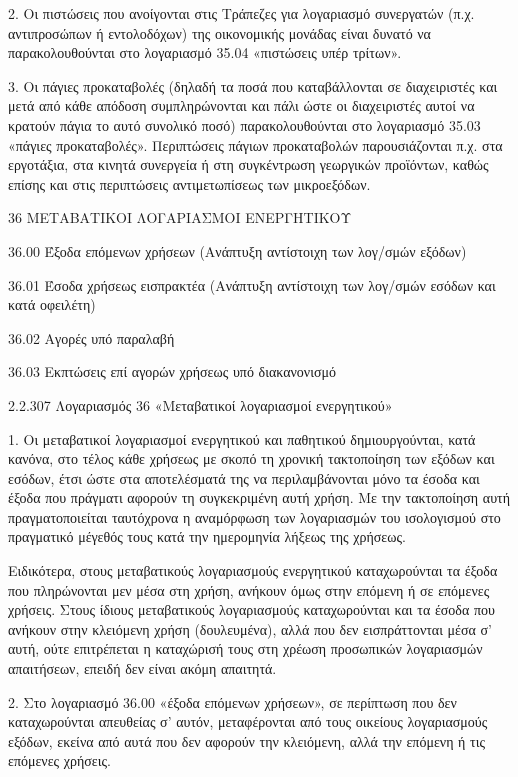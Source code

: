 \documentclass[A4,10pt,greek]{book}
\begin{document}
2. Οι πιστώσεις που ανοίγονται στις Τράπεζες για λογαριασμό συνεργατών (π.χ.  αντιπροσώπων ή εντολοδόχων) της οικονομικής μονάδας είναι δυνατό να παρακολουθούνται στο λογαριασμό 35.04 «πιστώσεις υπέρ τρίτων».

3. Οι πάγιες προκαταβολές (δηλαδή τα ποσά που καταβάλλονται σε διαχειριστές και μετά από κάθε απόδοση συμπληρώνονται και πάλι ώστε οι διαχειριστές αυτοί να κρατούν πάγια το αυτό συνολικό ποσό) παρακολουθούνται στο λογαριασμό 35.03 «πάγιες προκαταβολές». Περιπτώσεις πάγιων προκαταβολών παρουσιάζονται π.χ. στα εργοτάξια, στα κινητά συνεργεία ή στη συγκέντρωση γεωργικών προϊόντων, καθώς επίσης και στις περιπτώσεις αντιμετωπίσεως των μικροεξόδων.

 36   ΜΕΤΑΒΑΤΙΚΟΙ ΛΟΓΑΡΙΑΣΜΟΙ ΕΝΕΡΓΗΤΙΚΟΥ

        36.00   Έξοδα επόμενων χρήσεων
                    (Ανάπτυξη αντίστοιχη των λογ/σμών εξόδων)

        36.01   Έσοδα χρήσεως εισπρακτέα
                    (Ανάπτυξη αντίστοιχη των λογ/σμών εσόδων και κατά οφειλέτη)

        36.02   Αγορές υπό παραλαβή

        36.03   Εκπτώσεις επί αγορών χρήσεως υπό διακανονισμό

 

2.2.307 Λογαριασμός 36 «Μεταβατικοί λογαριασμοί ενεργητικού»

1. Οι μεταβατικοί λογαριασμοί ενεργητικού και παθητικού δημιουργούνται, κατά κανόνα, στο τέλος κάθε χρήσεως με σκοπό τη χρονική τακτοποίηση των εξόδων και εσόδων, έτσι ώστε στα αποτελέσματά της να περιλαμβάνονται μόνο τα έσοδα και έξοδα που πράγματι αφορούν τη συγκεκριμένη αυτή χρήση. Με την τακτοποίηση αυτή πραγματοποιείται ταυτόχρονα η αναμόρφωση των λογαριασμών του ισολογισμού στο πραγματικό μέγεθός τους κατά την ημερομηνία λήξεως της χρήσεως.

Ειδικότερα, στους μεταβατικούς λογαριασμούς ενεργητικού καταχωρούνται τα έξοδα που πληρώνονται μεν μέσα στη χρήση, ανήκουν όμως στην επόμενη ή σε επόμενες χρήσεις. Στους ίδιους μεταβατικούς λογαριασμούς καταχωρούνται και τα έσοδα που ανήκουν στην κλειόμενη χρήση (δουλευμένα), αλλά που δεν εισπράττονται μέσα σ' αυτή, ούτε επιτρέπεται η καταχώρισή τους στη χρέωση προσωπικών λογαριασμών απαιτήσεων, επειδή δεν είναι ακόμη απαιτητά.

2. Στο λογαριασμό 36.00 «έξοδα επόμενων χρήσεων», σε περίπτωση που δεν καταχωρούνται απευθείας σ' αυτόν, μεταφέρονται από τους οικείους λογαριασμούς εξόδων, εκείνα από αυτά που δεν αφορούν την κλειόμενη, αλλά την επόμενη ή τις επόμενες χρήσεις.
\end{document}
